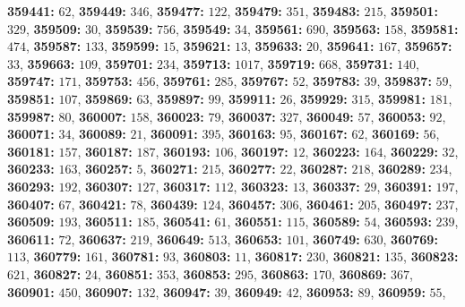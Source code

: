 \textsf{\bfseries 359441:} $62$, \textsf{\bfseries 359449:} $346$, \textsf{\bfseries 359477:} $122$, \textsf{\bfseries 359479:} $351$, \textsf{\bfseries 359483:} $215$, \textsf{\bfseries 359501:} $329$, \textsf{\bfseries 359509:} $30$, \textsf{\bfseries 359539:} $756$, \textsf{\bfseries 359549:} $34$, \textsf{\bfseries 359561:} $690$, \textsf{\bfseries 359563:} $158$, \textsf{\bfseries 359581:} $474$, \textsf{\bfseries 359587:} $133$, \textsf{\bfseries 359599:} $15$, \textsf{\bfseries 359621:} $13$, \textsf{\bfseries 359633:} $20$, \textsf{\bfseries 359641:} $167$, \textsf{\bfseries 359657:} $33$, \textsf{\bfseries 359663:} $109$, \textsf{\bfseries 359701:} $234$, \textsf{\bfseries 359713:} $1017$, \textsf{\bfseries 359719:} $668$, \textsf{\bfseries 359731:} $140$, \textsf{\bfseries 359747:} $171$, \textsf{\bfseries 359753:} $456$, \textsf{\bfseries 359761:} $285$, \textsf{\bfseries 359767:} $52$, \textsf{\bfseries 359783:} $39$, \textsf{\bfseries 359837:} $59$, \textsf{\bfseries 359851:} $107$, \textsf{\bfseries 359869:} $63$, \textsf{\bfseries 359897:} $99$, \textsf{\bfseries 359911:} $26$, \textsf{\bfseries 359929:} $315$, \textsf{\bfseries 359981:} $181$, \textsf{\bfseries 359987:} $80$, \textsf{\bfseries 360007:} $158$, \textsf{\bfseries 360023:} $79$, \textsf{\bfseries 360037:} $327$, \textsf{\bfseries 360049:} $57$, \textsf{\bfseries 360053:} $92$, \textsf{\bfseries 360071:} $34$, \textsf{\bfseries 360089:} $21$, \textsf{\bfseries 360091:} $395$, \textsf{\bfseries 360163:} $95$, \textsf{\bfseries 360167:} $62$, \textsf{\bfseries 360169:} $56$, \textsf{\bfseries 360181:} $157$, \textsf{\bfseries 360187:} $187$, \textsf{\bfseries 360193:} $106$, \textsf{\bfseries 360197:} $12$, \textsf{\bfseries 360223:} $164$, \textsf{\bfseries 360229:} $32$, \textsf{\bfseries 360233:} $163$, \textsf{\bfseries 360257:} $5$, \textsf{\bfseries 360271:} $215$, \textsf{\bfseries 360277:} $22$, \textsf{\bfseries 360287:} $218$, \textsf{\bfseries 360289:} $234$, \textsf{\bfseries 360293:} $192$, \textsf{\bfseries 360307:} $127$, \textsf{\bfseries 360317:} $112$, \textsf{\bfseries 360323:} $13$, \textsf{\bfseries 360337:} $29$, \textsf{\bfseries 360391:} $197$, \textsf{\bfseries 360407:} $67$, \textsf{\bfseries 360421:} $78$, \textsf{\bfseries 360439:} $124$, \textsf{\bfseries 360457:} $306$, \textsf{\bfseries 360461:} $205$, \textsf{\bfseries 360497:} $237$, \textsf{\bfseries 360509:} $193$, \textsf{\bfseries 360511:} $185$, \textsf{\bfseries 360541:} $61$, \textsf{\bfseries 360551:} $115$, \textsf{\bfseries 360589:} $54$, \textsf{\bfseries 360593:} $239$, \textsf{\bfseries 360611:} $72$, \textsf{\bfseries 360637:} $219$, \textsf{\bfseries 360649:} $513$, \textsf{\bfseries 360653:} $101$, \textsf{\bfseries 360749:} $630$, \textsf{\bfseries 360769:} $113$, \textsf{\bfseries 360779:} $161$, \textsf{\bfseries 360781:} $93$, \textsf{\bfseries 360803:} $11$, \textsf{\bfseries 360817:} $230$, \textsf{\bfseries 360821:} $135$, \textsf{\bfseries 360823:} $621$, \textsf{\bfseries 360827:} $24$, \textsf{\bfseries 360851:} $353$, \textsf{\bfseries 360853:} $295$, \textsf{\bfseries 360863:} $170$, \textsf{\bfseries 360869:} $367$, \textsf{\bfseries 360901:} $450$, \textsf{\bfseries 360907:} $132$, \textsf{\bfseries 360947:} $39$, \textsf{\bfseries 360949:} $42$, \textsf{\bfseries 360953:} $89$, \textsf{\bfseries 360959:} $55$, 
